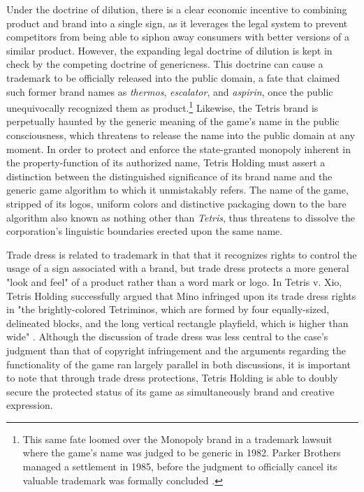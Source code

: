 Under the doctrine of dilution, there is a clear economic incentive to combining product and brand into a single sign, as it leverages the legal system to prevent competitors from being able to siphon away consumers with better versions of a similar product. However, the expanding legal doctrine of dilution is kept in check by the competing doctrine of genericness. This doctrine can cause a trademark to be officially released into the public domain, a fate that claimed such former brand names as \emph{thermos}, \emph{escalator}, and \emph{aspirin}, once the public unequivocally recognized them as product.\footnote{
  This same fate loomed over the Monopoly brand in a trademark lawsuit where the game's name was judged to be generic in 1982. Parker Brothers managed a settlement in 1985, before the judgment to officially cancel its valuable trademark was formally concluded \autocites{Hollie1983-nc}[120--5]{Orbanes2006-tn}.
}
Likewise, the Tetris brand is perpetually haunted by the generic meaning of the game's name in the public consciousness, which threatens to release the name into the public domain at any moment. In order to protect and enforce the state-granted monopoly inherent in the property-function of its authorized name, Tetris Holding must assert a distinction between the distinguished significance of its brand name and the generic game algorithm to which it unmistakably refers. The name of the game, stripped of its logos, uniform colors and distinctive packaging down to the bare algorithm also known as nothing other than \emph{Tetris}, thus threatens to dissolve the corporation's linguistic boundaries erected upon the same name.

Trade dress is related to trademark in that that it recognizes rights to control the usage of a sign associated with a brand, but trade dress protects a more general "look and feel" of a product rather than a word mark or logo. In Tetris v. Xio, Tetris Holding successfully argued that Mino infringed upon its trade dress rights in "the brightly-colored Tetriminos, which are formed by four equally-sized, delineated blocks, and the long vertical rectangle playfield, which is higher than wide" \autocite[415]{tetris-xio}. Although the discussion of trade dress was less central to the case's judgment than that of copyright infringement and the arguments regarding the functionality of the game ran largely parallel in both discussions, it is important to note that through trade dress protections, Tetris Holding is able to doubly secure the protected status of its game as simultaneously brand and creative expression.

